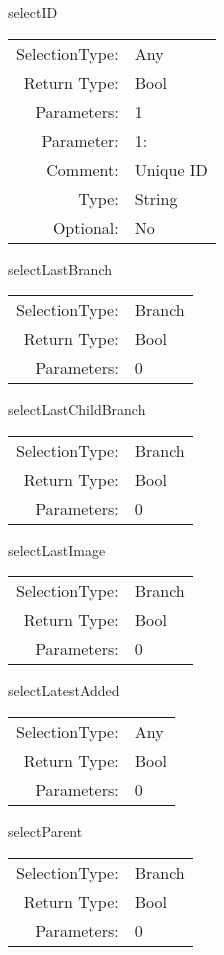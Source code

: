 \item selectID\\
\begin{tabular}{rl}
  SelectionType: & Any\\
    Return Type: & Bool\\
     Parameters: & 1\\
   Parameter: &  1:\\
        Comment: & Unique ID\\
           Type: & String\\
       Optional: &  No\\
\end{tabular}

\item selectLastBranch\\
\begin{tabular}{rl}
  SelectionType: & Branch\\
    Return Type: & Bool\\
     Parameters: & 0\\
\end{tabular}

\item selectLastChildBranch\\
\begin{tabular}{rl}
  SelectionType: & Branch\\
    Return Type: & Bool\\
     Parameters: & 0\\
\end{tabular}

\item selectLastImage\\
\begin{tabular}{rl}
  SelectionType: & Branch\\
    Return Type: & Bool\\
     Parameters: & 0\\
\end{tabular}

\item selectLatestAdded\\
\begin{tabular}{rl}
  SelectionType: & Any\\
    Return Type: & Bool\\
     Parameters: & 0\\
\end{tabular}

\item selectParent\\
\begin{tabular}{rl}
  SelectionType: & Branch\\
    Return Type: & Bool\\
     Parameters: & 0\\
\end{tabular}


